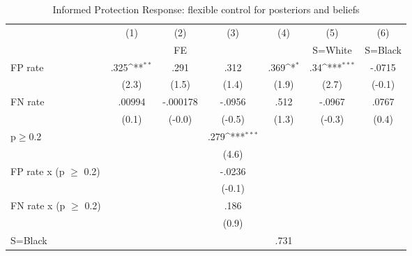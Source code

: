 \begin{table}[htbp]\centering
\def\sym#1{\ifmmode^{#1}\else\(^{#1}\)\fi}
\caption{Informed Protection Response: flexible control for posteriors and beliefs}
\begin{tabular}{l*{6}{c}}
\hline\hline
                &\multicolumn{1}{c}{(1)}&\multicolumn{1}{c}{(2)}&\multicolumn{1}{c}{(3)}&\multicolumn{1}{c}{(4)}&\multicolumn{1}{c}{(5)}&\multicolumn{1}{c}{(6)}\\
                &\multicolumn{1}{c}{}&\multicolumn{1}{c}{FE}&\multicolumn{1}{c}{}&\multicolumn{1}{c}{}&\multicolumn{1}{c}{S=White}&\multicolumn{1}{c}{S=Black}\\
\hline
FP rate         &     .325\sym{**} &     .291         &     .312         &     .369\sym{*}  &      .34\sym{***}&   -.0715         \\
                &    (2.3)         &    (1.5)         &    (1.4)         &    (1.9)         &    (2.7)         &   (-0.1)         \\
FN rate         &   .00994         & -.000178         &   -.0956         &     .512         &   -.0967         &    .0767         \\
                &    (0.1)         &   (-0.0)         &   (-0.5)         &    (1.3)         &   (-0.3)         &    (0.4)         \\
p$\geq$0.2      &                  &                  &     .279\sym{***}&                  &                  &                  \\
                &                  &                  &    (4.6)         &                  &                  &                  \\
FP rate x (p $\geq$ 0.2)&                  &                  &   -.0236         &                  &                  &                  \\
                &                  &                  &   (-0.1)         &                  &                  &                  \\
FN rate x (p $\geq$ 0.2)&                  &                  &     .186         &                  &                  &                  \\
                &                  &                  &    (0.9)         &                  &                  &                  \\
S=Black         &                  &                  &                  &     .731         &                  &                  \\

\end{tabular}
\end{table}
